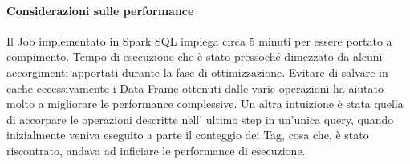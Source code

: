   \paragraph{Considerazioni sulle performance}\label{par:job1:spark:performance}

  Il Job implementato in Spark SQL impiega circa 5 minuti per essere portato a compimento.
  Tempo di esecuzione che è stato pressoché dimezzato da alcuni accorgimenti apportati durante la fase di ottimizzazione.
  Evitare di salvare in cache eccessivamente i Data Frame ottenuti dalle varie operazioni ha aiutato molto a migliorare
  le performance complessive.
  Un altra intuizione è stata quella di accorpare le operazioni descritte nell' ultimo step in un'unica query, quando inizialmente
  veniva eseguito a parte il conteggio dei Tag, cosa che, è stato riscontrato, andava ad inficiare le performance di esecuzione.

